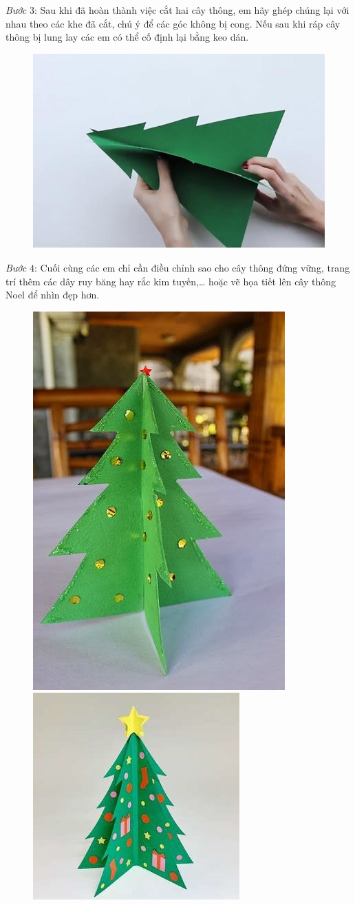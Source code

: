 \begin{multicols}{2}
\begin{figure}[H]
		\vspace*{-15pt}
	\end{figure}
	\textit{Bước} $3$: Sau khi đã hoàn thành việc cắt hai cây thông, em hãy ghép chúng lại với nhau theo các khe đã cắt, chú ý để các góc không bị cong. Nếu sau khi ráp cây thông bị lung lay các em có thể cố định lại bằng keo dán.
	\begin{figure}[H]
		\vspace*{-5pt}
		\centering
		\captionsetup{labelformat= empty, justification=centering}
		\includegraphics[width= 1\linewidth]{8}
		\vspace*{-15pt}
	\end{figure}
	\textit{Bước} $4$: Cuối cùng các em chỉ cần điều chỉnh sao cho cây thông đứng vững, trang trí thêm các dây ruy băng hay rắc kim tuyến,… hoặc vẽ họa tiết lên cây thông Noel để nhìn đẹp hơn.
	\begin{figure}[H]
		\vspace*{-5pt}
		\centering
		\captionsetup{labelformat= empty, justification=centering}
		\includegraphics[height= 0.31\linewidth]{9a}
		\includegraphics[height= 0.31\linewidth]{9b}

\end{figure}
\end{multicols}

